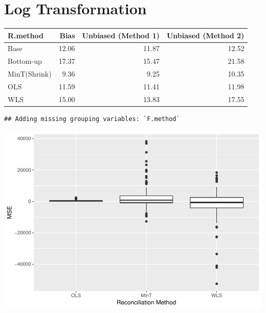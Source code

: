 \documentclass[]{article}
\begin{document}
\section{Log Transformation}\label{log-transformation}

\begin{tabular}{l|r|r|r}
\hline
R.method & Bias & Unbiased (Method 1) & Unbiased (Method 2)\\
\hline
Base & 12.06 & 11.87 & 12.52\\
\hline
Bottom-up & 17.37 & 15.47 & 21.58\\
\hline
MinT(Shrink) & 9.36 & 9.25 & 10.35\\
\hline
OLS & 11.59 & 11.41 & 11.98\\
\hline
WLS & 15.00 & 13.83 & 17.55\\
\hline
\end{tabular}

\begin{verbatim}
## Adding missing grouping variables: `F.method`
\end{verbatim}

\includegraphics{TourismData-Final-results_files/figure-latex/unnamed-chunk-5-1.pdf}
\end{document}
